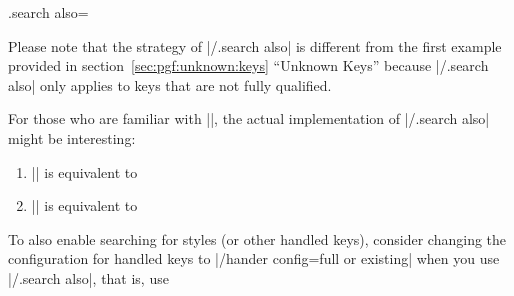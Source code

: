 \begin{handler}{{.search also}=}
\begin{codeexample}[]
%
\end{codeexample}

    Please note that the strategy of |/.search also| is different from the
    first example provided in section~\ref{sec:pgf:unknown:keys} ``Unknown
    Keys'' because |/.search also| only applies to keys that are not fully
    qualified.

    For those who are familiar with |\pgfkeys|, the actual implementation of
    |/.search also| might be interesting:
    \begin{enumerate}
        \item || is equivalent to
\begin{codeexample}
\end{codeexample}
        \item || is equivalent to
\begin{codeexample}
\end{codeexample}
    \end{enumerate}

    To also enable searching for styles (or other handled keys), consider
    changing the configuration for handled keys to
    |/hander config=full or existing| when you use |/.search also|, that is,
    use
\begin{codeexample}
\end{codeexample}
\end{handler}


